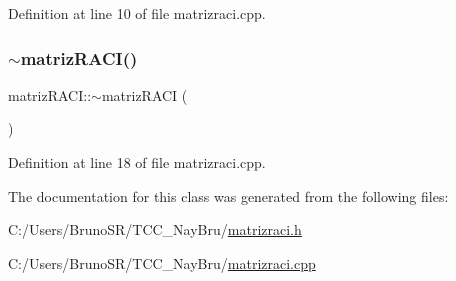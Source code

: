 Definition at line 10 of file matrizraci.\+cpp.

\hypertarget{classmatriz_r_a_c_i_acf5d48703954736fe205c918333950a0}{}\label{classmatriz_r_a_c_i_acf5d48703954736fe205c918333950a0} 
\subsubsection{\texorpdfstring{$\sim$matriz\+R\+A\+C\+I()}{~matrizRACI()}}
{\footnotesize\ttfamily matriz\+R\+A\+C\+I\+::$\sim$matriz\+R\+A\+CI (\begin{DoxyParamCaption}{ }\end{DoxyParamCaption})}



Definition at line 18 of file matrizraci.\+cpp.



The documentation for this class was generated from the following files\+:\begin{DoxyCompactItemize}
\item 
C\+:/\+Users/\+Bruno\+S\+R/\+T\+C\+C\+\_\+\+Nay\+Bru/\hyperlink{matrizraci_8h}{matrizraci.\+h}\item 
C\+:/\+Users/\+Bruno\+S\+R/\+T\+C\+C\+\_\+\+Nay\+Bru/\hyperlink{matrizraci_8cpp}{matrizraci.\+cpp}\end{DoxyCompactItemize}
